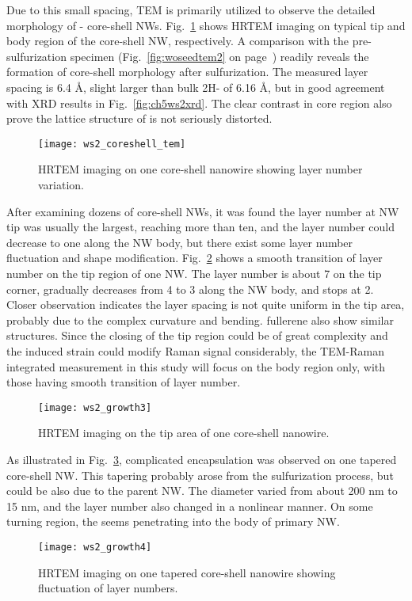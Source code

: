 Due to this small spacing, TEM is primarily utilized to observe the detailed morphology of - core-shell NWs. Fig.~\ref{fig:ch5ws2tem1} shows HRTEM imaging on typical tip and body region of the core-shell NW, respectively. A comparison with the pre-sulfurization specimen (Fig.~\ref{fig:woseedtem2} on page~\pageref{fig:woseedtem2}) readily reveals the formation of core-shell morphology after sulfurization. The measured layer spacing is 6.4 \si{\angstrom}, slight larger than bulk 2H- of 6.16 \si{\angstrom}, but in good agreement with XRD results in Fig.~\ref{fig:ch5ws2xrd}. The clear contrast in core region also prove the lattice structure of  is not seriously distorted.
\begin{figure}[htb]
\centering
\texttt{[image: ws2\_coreshell\_tem]}
\caption[HRTEM imaging on one core-shell nanowire showing layer number variation]{HRTEM imaging on one core-shell nanowire showing layer number variation.}
\label{fig:ch5ws2tem1}
\end{figure}
After examining dozens of core-shell NWs, it was found the  layer number at NW tip was usually the largest, reaching more than ten, and the layer number could decrease to one along the NW body, but there exist some layer number fluctuation and shape modification. Fig.~\ref{fig:ch5ws2tem3} shows a smooth transition of  layer number on the tip region of one NW. The layer number is about 7 on the tip corner, gradually decreases from 4 to 3 along the NW body, and stops at 2. Closer observation indicates the layer spacing is not quite uniform in the tip area, probably due to the complex curvature and bending.  fullerene also show similar structures. Since the closing of the tip region could be of great complexity and the induced strain could modify Raman signal considerably, the TEM-Raman integrated measurement in this study will focus on the body region only, with those having smooth transition of layer number.
\begin{figure}[htb]
\centering
\texttt{[image: ws2\_growth3]}
\caption[HRTEM imaging on the tip area of one core-shell nanowire]{HRTEM imaging on the tip area of one core-shell nanowire.}
\label{fig:ch5ws2tem3}
\end{figure}
As illustrated in Fig.~\ref{fig:ch5ws2tem4}, complicated  encapsulation was observed on one tapered core-shell NW. This tapering probably arose from the sulfurization process, but could be also due to the parent  NW. The diameter varied from about 200 nm to 15 nm, and the  layer number also changed in a nonlinear manner. On some turning region, the  seems penetrating into the body of primary  NW. 
\begin{figure}[htb]
\centering
\texttt{[image: ws2\_growth4]}
\caption[HRTEM imaging on one tapered core-shell nanowire showing fluctuation of layer numbers]{HRTEM imaging on one tapered core-shell nanowire showing fluctuation of layer numbers.}
\label{fig:ch5ws2tem4}
\end{figure}

